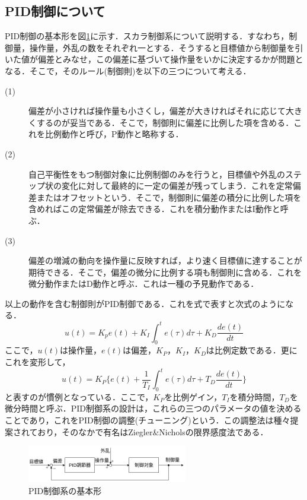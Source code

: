 \documentclass[12pt]{jsarticle}
\begin{document}
\subsection{PID制御について}
PID制御の基本形を図\ref{PID-normal-form}に示す．スカラ制御系について説明する．すなわち，制御量，操作量，外乱の数をそれぞれ一とする．そうすると目標値から制御量を引いた値が偏差とみなせ，この偏差に基づいて操作量をいかに決定するかが問題となる．そこで，そのルール(制御則)を以下の三つについて考える．
\begin{description}
  \item[(1)] 偏差が小さければ操作量も小さくし，偏差が大きければそれに応じて大きくするのが妥当である．そこで，制御則に偏差に比例した項を含める．これを比例動作と呼び，P動作と略称する．
  \item[(2)] 自己平衡性をもつ制御対象に比例制御のみを行うと，目標値や外乱のステップ状の変化に対して最終的に一定の偏差が残ってしまう．これを定常偏差またはオフセットという．そこで，制御則に偏差の積分に比例した項を含めればこの定常偏差が除去できる．これを積分動作またはI動作と呼ぶ．
  \item[(3)] 偏差の増減の動向を操作量に反映すれば，より速く目標値に達することが期待できる．そこで，偏差の微分に比例する項も制御則に含める．これを微分動作またはD動作と呼ぶ．これは一種の予見動作である．
\end{description}
以上の動作を含む制御則がPID制御である．これを式で表すと次式のようになる．
\begin{equation}
  \label{}
  u(t) = K_p e(t) + K_I\int^t_0 e(\tau) d\tau + K_D \frac{de(t)}{dt}
\end{equation}
ここで，$u(t)$は操作量，$e(t)$は偏差，$K_P$，$K_I$，$K_D$は比例定数である．更にこれを変形して，
\begin{equation}
  \label{}
  u(t) = K_P\{ e(t) + \frac{1}{T_I}\int^t_0 e(\tau) d\tau + T_D\frac{de(t)}{dt}\}
\end{equation}
と表すのが慣例となっている．ここで，$K_P$を比例ゲイン，$T_I$を積分時間，$T_D$を微分時間と呼ぶ．PID制御系の設計は，これらの三つのパラメータの値を決めることであり，これをPID制御の調整(チューニング)という．この調整法は種々提案されており，そのなかで有名はZiegler\&Nicholsの限界感度法である．
\begin{figure}[tb]
  \begin{center}
    \includegraphics[clip,width=7.0cm]{../img/2-A1.png}
    \caption{PID制御系の基本形}
    \label{PID-normal-form}
  \end{center}
\end{figure}
\end{document}
